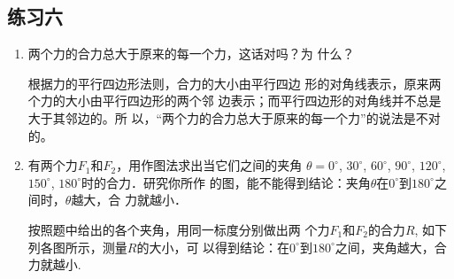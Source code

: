 \subsection{练习六}
\begin{enumerate}
\item 两个力的合力总大于原来的每一个力，这话对吗？为
什么？

\begin{solution}
    根据力的平行四边形法则，合力的大小由平行四边
形的对角线表示，原来两个力的大小由平行四边形的两个邻
边表示；而平行四边形的对角线并不总是大于其邻边的。所
以，“两个力的合力总大于原来的每一个力”的说法是不对的。
\end{solution}
\item 有两个力$F_1$和$F_2$，用作图法求出当它们之间的夹角
$\theta =0^\circ$, $30^\circ$, $60^\circ$, $90^\circ$, $120^\circ$, $150^\circ$, $180^\circ$时的合力．研究你所作
的图，能不能得到结论：夹角$\theta$在$0^\circ$到$180^\circ$之间时，$\theta $越大，合
力就越小．

\begin{solution}
    按照题中给出的各个夹角，用同一标度分别做出两
个力$F_1$和$F_2$的合力$R$, 如下列各图所示，测量$R$的大小，可
以得到结论：在$0^{\circ}$到$180^{\circ}$之间，夹角越大，合力就越小.

\begin{figure}[htp]\centering
    \begin{minipage}[t]{0.48\textwidth}
    \centering
{}
    \caption{}
    \end{minipage}
    \begin{minipage}[t]{0.48\textwidth}
    \centering
    \caption{}
    \end{minipage}
    \end{figure}


\end{solution}
\end{enumerate}

